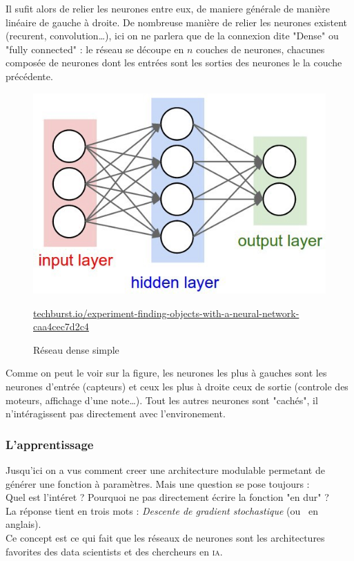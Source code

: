 Il sufit alors de relier les neurones entre eux, de maniere générale de manière linéaire de gauche à droite.
De nombreuse manière de relier les neurones existent (recurent, convolution\ldots),
ici on ne parlera que de la connexion dite "Dense" ou "fully connected" :
le réseau se découpe en $n$ couches de neurones,
chacunes composée de neurones dont les entrées sont les sorties des neurones le la couche précédente.
\begin{figure}[H]
    \center
    \includegraphics[height=\petit]{pict/net1.jpeg}
	\caption{Réseau dense simple}
    {\tiny \url{techburst.io/experiment-finding-objects-with-a-neural-network-caa4cec7d2c4}}
	\label{fig:simple-dense}
\end{figure}
Comme on peut le voir sur la figure,
les neurones les plus à gauches sont les neurones d'entrée (capteurs)
et ceux les plus à droite ceux de sortie (controle des moteurs, affichage d'une note\ldots).
Tout les autres neurones sont "cachés", il n'intéragissent pas directement avec l'environement.


\subsubsection{L'apprentissage}
Jusqu'ici on a vus comment creer une architecture modulable permetant de générer une fonction à paramètres.
Mais une question se pose toujours :\\
Quel est l'intéret ?
Pourquoi ne pas directement écrire la fonction "en dur" ?\\
La réponse tient en trois mots : \textit{Descente de gradient stochastique} (ou  \sgd\ en anglais). \\
Ce concept est ce qui fait que les réseaux de neurones sont les architectures favorites
des data scientists et des chercheurs en \textsc{ia}.\\


